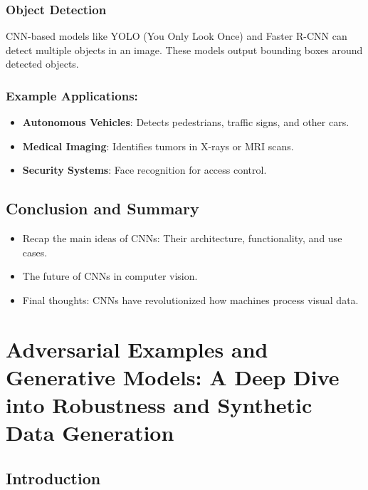 \documentclass[
  letterpaper,
  DIV=11,
  numbers=noendperiod]{scrreprt}
\providecommand{\tightlist}{%
  \setlength{\itemsep}{0pt}\setlength{\parskip}{0pt}}\usepackage{longtable,booktabs,array}
\begin{document}
\subsection{Object Detection}\label{object-detection}

CNN-based models like YOLO (You Only Look Once) and Faster R-CNN can
detect multiple objects in an image. These models output bounding boxes
around detected objects.

\subsection{Example Applications:}\label{example-applications}

\begin{itemize}
\tightlist
\item
  \textbf{Autonomous Vehicles}: Detects pedestrians, traffic signs, and
  other cars.
\item
  \textbf{Medical Imaging}: Identifies tumors in X-rays or MRI scans.
\item
  \textbf{Security Systems}: Face recognition for access control.
\end{itemize}

\section{Conclusion and Summary}\label{conclusion-and-summary}

\begin{itemize}
\tightlist
\item
  Recap the main ideas of CNNs: Their architecture, functionality, and
  use cases.
\item
  The future of CNNs in computer vision.
\item
  Final thoughts: CNNs have revolutionized how machines process visual
  data.
\end{itemize}


\chapter{Adversarial Examples and Generative Models: A Deep Dive into
Robustness and Synthetic Data
Generation}\label{adversarial-examples-and-generative-models-a-deep-dive-into-robustness-and-synthetic-data-generation}

\section{Introduction}\label{introduction-4}
\end{document}
